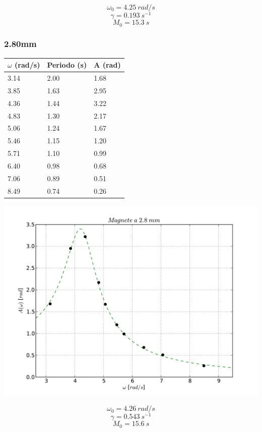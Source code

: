 \documentclass[a4paper,10pt]{report}
\begin{document}
$$ \omega_0 = 4.25\ rad/s $$
$$ \gamma = 0.193\ s^{-1}$$
$$ M_0 = 15.3\ s$$

\subsubsection{2.80mm}
\begin{center}
\begin{tabular}{l|l|l}
$\omega$ (rad/s) & Periodo (s) & A (rad) \\
\midrule
3.14 & 2.00 & 1.68 \\
3.85 & 1.63 & 2.95 \\
4.36 & 1.44 & 3.22 \\
4.83 & 1.30 & 2.17 \\
5.06 & 1.24 & 1.67 \\
5.46 & 1.15 & 1.20 \\
5.71 & 1.10 & 0.99 \\
6.40 & 0.98 & 0.68 \\
7.06 & 0.89 & 0.51 \\
8.49 & 0.74 & 0.26 \\
\midrule
\end{tabular}
\end{center}
\includegraphics[scale=0.75]{"../grafici/Magnetea28mm"}



$$ \omega_0 = 4.26\ rad/s $$
$$ \gamma = 0.543\ s^{-1} $$
$$ M_0 = 15.6\ s$$
\end{document}
